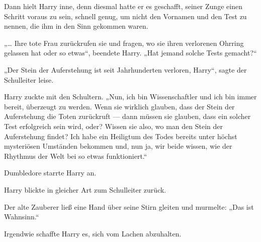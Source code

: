 Dann hielt Harry inne, denn diesmal hatte er es geschafft, seiner Zunge einen Schritt voraus zu sein, schnell genug, um nicht den Vornamen und den Test zu nennen, die ihm in den Sinn gekommen waren.

„… Ihre tote Frau zurückrufen sie und fragen, wo sie ihren verlorenen Ohrring gelassen hat oder so etwas“, beendete Harry.
„Hat jemand solche Tests gemacht?“

„Der Stein der Auferstehung ist seit Jahrhunderten verloren, Harry“, sagte der Schulleiter leise.

Harry zuckte mit den Schultern.
„Nun, ich bin Wissenschaftler und ich bin immer bereit, überzeugt zu werden. Wenn sie wirklich glauben, dass der Stein der Auferstehung die Toten zurückruft — dann müssen sie glauben, dass ein solcher Test erfolgreich sein wird, oder? Wissen sie also, wo man den Stein der Auferstehung findet? Ich habe ein Heiligtum des Todes bereits unter höchst mysteriösen Umständen bekommen und, nun ja, wir beide wissen, wie der Rhythmus der Welt bei so etwas funktioniert.“

Dumbledore starrte Harry an.

Harry blickte in gleicher Art zum Schulleiter zurück.

Der alte Zauberer ließ eine Hand über seine Stirn gleiten und murmelte:
„Das ist Wahnsinn.“

Irgendwie schaffte Harry es, sich vom Lachen abzuhalten.

